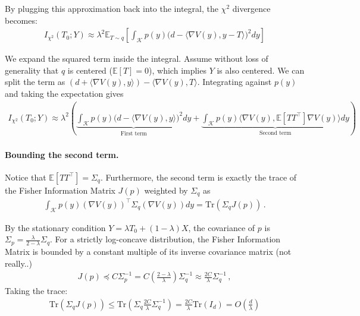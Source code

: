 \documentclass{article}
\theoremstyle{plain}
\theoremstyle{definition}
\theoremstyle{plain}
\newcommand{\cK}{\mathcal K}
\begin{document}
\noindent
By plugging this approximation back into the integral, the $\chi^2$ divergence becomes:
\begin{align}
    I_{\chi^2}(T_0; Y) \approx \lambda^2 \mathbb{E}_{T \sim q}
    \left[
        \int_{\cK} p(y) \Big( d - \langle \nabla V(y), y-T \rangle \Big)^2 dy
        \right]
\end{align}

We expand the squared term inside the integral. Assume without loss of generality that $q$ is centered ($\mathbb{E}[T] = 0$), which implies $Y$ is also centered.
We can split the term as $(d + \langle \nabla V(y), y \rangle) - \langle \nabla V(y), T \rangle$.
Integrating against $p(y)$ and taking the expectation gives
\begin{align}
    I_{\chi^2}(T_0; Y) \approx \lambda^2 \left(
    \underbrace{\int_{\cK} p(y) \big( d - \langle \nabla V(y), y \rangle \big)^2 dy}_{\text{First term}} + \underbrace{\int_{\cK} p(y) \langle \nabla V(y), \mathbb{E}[T T^\top] \nabla V(y) \rangle dy}_{\text{Second term}} \right)
\end{align}

\paragraph{Bounding the second term.}
Notice that $\mathbb{E}[TT^\top] = \Sigma_q$. Furthermore, the second term is exactly the trace of the Fisher Information Matrix $J(p)$ weighted by $\Sigma_q$ as
\begin{align}
    \int_{\cK} p(y) (\nabla V(y))^\top \Sigma_q (\nabla V(y)) dy = \text{Tr}(\Sigma_q J(p))\,.
\end{align}

By the stationary condition $Y = \lambda T_0 + (1-\lambda)X$, the covariance of $p$ is $\Sigma_p = \frac{\lambda}{2-\lambda} \Sigma_q$.
For a strictly log-concave distribution, the Fisher Information Matrix is bounded by a constant multiple of its inverse covariance matrix (not really..)
\begin{align}
    J(p) \preceq C \Sigma_p^{-1} = C \left( \frac{2-\lambda}{\lambda} \right) \Sigma_q^{-1} \approx \frac{2C}{\lambda} \Sigma_q^{-1}\,,
\end{align}
Taking the trace:
\begin{align}
    \text{Tr}(\Sigma_q J(p)) \le \text{Tr}\left( \Sigma_q \frac{2C}{\lambda} \Sigma_q^{-1} \right) = \frac{2C}{\lambda} \text{Tr}(I_d) = O\left(\frac{d}{\lambda}\right)
\end{align}
\end{document}
